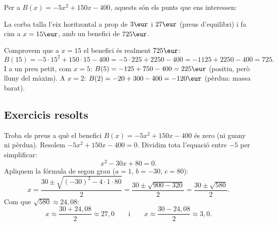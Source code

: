 \begin{exemple}
Per a $B(x)=-5x^2+150x-400$, aquests són els punts que ens interessen:

\begin{center}

\end{center}

\noindent La corba talla l'eix horitzontal a prop de $3\eur$ i $27\eur$ (preus
d'equilibri) i fa cim a $x=15\eur$, amb un benefici de $725\eur$.
\end{exemple}

\begin{exemple}
Comprovem que a $x=15$ el benefici és realment $725\eur$:
\[
B(15)=-5\cdot 15^2+150\cdot 15-400=-5\cdot 225+2250-400=-1125+2250-400=725.
\]
I a un preu petit, com $x=5$: $B(5)=-125+750-400=225\eur$ (positiu, però lluny del
màxim). A $x=2$: $B(2)=-20+300-400=-120\eur$ (pèrdua: massa barat).
\end{exemple}

\subsection{Exercicis resolts}

\begin{exresolt}
Troba els preus a què el benefici $B(x)=-5x^2+150x-400$ és zero (ni guany ni
pèrdua).
\solucio
Resolem $-5x^2+150x-400=0$. Dividim tota l'equació entre $-5$ per simplificar:
\[
x^2-30x+80=0.
\]
Apliquem la fórmula de segon grau ($a=1$, $b=-30$, $c=80$):
\[
x=\frac{30\pm\sqrt{(-30)^2-4\cdot 1\cdot 80}}{2}
 =\frac{30\pm\sqrt{900-320}}{2}
 =\frac{30\pm\sqrt{580}}{2}.
\]
Com que $\sqrt{580}\approx 24,08$:
\[
x\approx\frac{30+24,08}{2}\approx 27,0
\qquad\text{i}\qquad
x\approx\frac{30-24,08}{2}\approx 3,0.
\]
\end{exresolt}

